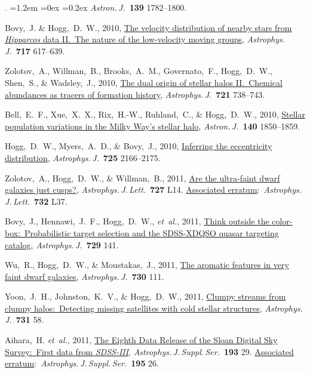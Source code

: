 \documentclass[10pt,letterpaper]{article}
\newcommand{\acronym}[1]{{\small{#1}}}
\newcommand{\foreign}[1]{\textsl{#1}}
\newcommand{\etal}{\foreign{et~al.}}
\newcommand{\project}[1]{\textsl{#1}}
\newcommand{\doi}[2]{\href{http://dx.doi.org/#1}{{#2}}}
\newcommand{\deemph}[1]{\textcolor{grey}{\footnotesize{#1}}}
\newcommand{\pubnumber}[1]{\deemph{{#1}.}}
\newcounter{refpubnum}
\newcommand{\hogglist}{%
    \rightmargin=0in
    \leftmargin=1.2em
    \topsep=0ex
    \partopsep=0pt
    \itemsep=0.2ex
    \parsep=0pt
    \itemindent=-1.0\leftmargin
    \listparindent=0.0\leftmargin
    \settowidth{\labelsep}{~}
    \usecounter{refpubnum}
  }
\begin{document}
\begin{list}{\pubnumber{\therefpubnum}}{\hogglist}
\textit{Astron.\,J.}\ \textbf{139} 1782--1800.
\item
Bovy,~J. \& Hogg,~D.~W., 2010,
\doi{10.1088/0004-637X/717/2/617}{The velocity distribution of nearby stars from \project{Hipparcos} data \acronym{II}.\ The nature of the low-velocity moving groups},
\textit{Astrophys.\,J.}\ \textbf{717} 617--639.
\item
Zolotov,~A., Willman,~B., Brooks,~A.~M., Governato,~F., Hogg,~D.~W., Shen,~S., \& Wadsley,~J., 2010,
\doi{10.1088/0004-637X/721/1/738}{The dual origin of stellar halos \acronym{II}.\ Chemical abundances as tracers of formation history},
\textit{Astrophys.\,J.}\ \textbf{721} 738--743.
\item
Bell,~E.~F., Xue,~X.~X., Rix,~H.-W., Ruhland,~C., \& Hogg,~D.~W., 2010,
\doi{10.1088/0004-6256/140/6/1850}{Stellar population variations in the Milky Way's stellar halo},
\textit{Astron.\,J.}\ \textbf{140} 1850--1859.
\item
Hogg,~D.~W., Myers,~A.~D., \& Bovy,~J., 2010,
\doi{10.1088/0004-637X/725/2/2166}{Inferring the eccentricity distribution},
\textit{Astrophys.\,J.}\ \textbf{725} 2166--2175.
\item
Zolotov,~A., Hogg,~D.~W., \& Willman,~B., 2011,
\doi{10.1088/2041-8205/727/1/L14}{Are the ultra-faint dwarf galaxies just cusps?},
\textit{Astrophys.\,J.\,Lett.}\ \textbf{727} L14.
\doi{10.1088/2041-8205/732/2/L37}{Associated erratum}:\ \textit{Astrophys.\,J.\,Lett.}\ \textbf{732} L37.
\item
Bovy,~J., Hennawi,~J.~F., Hogg,~D.~W., \etal, 2011,
\doi{10.1088/0004-637X/729/2/141}{Think outside the color-box:\ Probabilistic target selection and the \acronym{SDSS-XDQSO} quasar targeting catalog},
\textit{Astrophys.\,J.}\ \textbf{729} 141.
\item
Wu,~R., Hogg,~D.~W., \& Moustakas,~J., 2011,
\doi{10.1088/0004-637X/730/2/111}{The aromatic features in very faint dwarf galaxies},
\textit{Astrophys.\,J.}\ \textbf{730} 111.
\item
Yoon,~J.~H., Johnston,~K.~V., \& Hogg,~D.~W., 2011,
\doi{10.1088/0004-637X/731/1/58}{Clumpy streams from clumpy halos:\ Detecting missing satellites with cold stellar structures}, 
\textit{Astrophys.\,J.}\ \textbf{731} 58.
\item
Aihara,~H. \etal, 2011,
\doi{10.1088/0067-0049/193/2/29}{The Eighth Data Release of the Sloan Digital Sky Survey:\ First data from \project{\acronym{SDSS-III}}},
\textit{Astrophys.\,J.\,Suppl.\,Ser.}\ \textbf{193} 29.
\doi{10.1088/0067-0049/195/2/26}{Associated erratum}:\ \textit{Astrophys.\,J.\,Suppl.\,Ser.}\ \textbf{195} 26.

\end{list}
\end{document}
